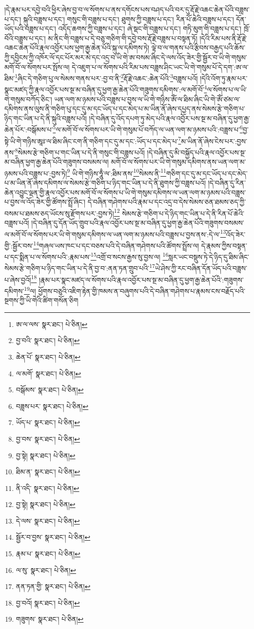 །དེ་རྣམ་པར་དབྱེ་བའི་ཕྱིར་ཞེས་བྱ་བ་ལ་སོགས་པ་ནས་དགོངས་པས་བཤད་པའི་བར་དུ་རྡོ་རྗེ་འཆང་ཆེན་པོའི་བཟླས་པ་དང་། སྐུའི་བཟླས་པ་དང་། གསུང་གི་བཟླས་པ་དང་། ཐུགས་ཀྱི་བཟླས་པ་དང་། རིན་པོ་ཆེའི་བཟླས་པ་དང་། དོན་ཡོད་པའི་བཟླས་པ་དང་། འདོད་ཆགས་ཀྱི་བཟླས་པ་དང་། ཞེ་སྡང་གི་བཟླས་པ་དང་། གཏི་མུག་གི་བཟླས་པ་དང་། ཁྲོ་བོའི་བཟླས་པ་དང་། མ་ནིང་གི་བཟླས་པ་དེ་བཅུ་གཅིག་གི་དབྱེ་བས་རྡོ་རྗེ་བཟླས་པ་བསྟན་ཏོ། །དེའི་རིམ་པས་ནི་རྡོ་རྗེ་འཆང་ཆེན་པོའི་རྣལ་འབྱོར་པས་ཕྱག་རྒྱ་ཆེན་པོའི་སྐུ་ལ་དམིགས་ཏེ། ལྟེ་བ་ལ་གནས་པའི་རྩིབས་བརྒྱད་པའི་ཆོས་ཀྱི་དབྱིངས་ཀྱི་འཁོར་ལོ་དང་པོར་མར་མེ་དང་འདྲ་བ་ཡི་གེ་ཨ་བསམ་ཞིང་དེ་ལས་འོད་ཟེར་གྱི་སྦྱོར་བ་ཡི་གེ་གསུམ་མགོ་བོ་ལ་སོགས་པར་སྤོས་ལ། དེ་འཇུག་པ་ལ་སོགས་པའི་རིམ་པས་བཟླས་ཤིང་ཡང་ཡི་གེ་གསུམ་པོ་དེ་དག་:ཨ་ལ་ཐིམ་\footnote{ཨ་ལ་ལས་  སྣར་ཐང་།  པེ་ཅིན། }ཞིང་དེ་གཅིག་པུ་ལ་སེམས་གནས་པར་:བྱ་བ་ནི་\footnote{བྱ་བའི་  སྣར་ཐང་།  པེ་ཅིན། }རྡོ་རྗེ་འཆང་:ཆེན་པོའི་\footnote{ཆེན་པོ་  སྣར་ཐང་།  པེ་ཅིན། }བཟླས་པའོ། །དེའི་འོག་ཏུ་རྣམ་པར་སྣང་མཛད་ཀྱི་རྣལ་འབྱོར་པས་སྔ་མ་བཞིན་དུ་ཕྱག་རྒྱ་ཆེན་པོའི་གཟུགས་དམིགས་:ལ་མགོ་བོ་\footnote{ལ་མགོ་  སྣར་ཐང་།  པེ་ཅིན། }ལ་སོགས་པ་ལ་ཡི་གེ་གསུམ་བཀོད་ཅིང་། ཡན་ལག་མ་ཉམས་པའི་བཟླས་པ་བྱས་ལ་ཡི་གེ་གཉིས་ཨོཾ་ལ་ཐིམ་ཞིང་ཡི་གེ་ཨོཾ་ཙམ་ལ་དམིགས་ནས་ལུས་ནི་གཅིག་པུ་དང་དུ་མ་དང་ཡོད་པ་དང་མེད་པ་མ་ཡིན་ནོ་ཞེས་དཔྱད་ནས་སེམས་རྩེ་གཅིག་པ་ཉིད་གང་ཡིན་པ་དེ་ནི་སྐུའི་བཟླས་པའོ། །དེ་བཞིན་དུ་འོད་དཔག་ཏུ་མེད་པའི་རྣལ་འབྱོར་པས་སྔ་མ་བཞིན་དུ་ཕྱག་རྒྱ་ཆེན་པོར་:བསྒོམས་པ་\footnote{བསྒོམས་  སྣར་ཐང་།  པེ་ཅིན། }ལ་མགོ་བོ་ལ་སོགས་པར་ཡི་གེ་གསུམ་པོ་བཀོད་ལ་ཡན་ལག་མ་ཉམས་པའི་:བཟླས་པ་\footnote{བཟླས་པར་  སྣར་ཐང་།  པེ་ཅིན། }བྱ་སྟེ་ཡི་གེ་གཉིས་ཨཱཿ་ལ་ཐིམ་ཞིང་ངག་ནི་གཅིག་དང་དུ་མ་དང་:ཡོད་པ་དང་མེད་པ་\footnote{ཡོད་པ་  སྣར་ཐང་།  པེ་ཅིན། }མ་ཡིན་ནོ་ཞེས་ངེས་པར་:བྱས་ནས་\footnote{བྱ་བས་  སྣར་ཐང་།  པེ་ཅིན། }སེམས་རྩེ་གཅིག་པ་གང་ཡིན་པ་དེ་ནི་གསུང་གི་བཟླས་པའོ། །དེ་བཞིན་དུ་མི་བསྐྱོད་པའི་རྣལ་འབྱོར་པས་སྔ་མ་བཞིན་ཕྱག་རྒྱ་ཆེན་པོའི་གཟུགས་བསམས་ལ། མགོ་བོ་ལ་སོགས་པར་ཡི་གེ་གསུམ་དམིགས་ནས་ཡན་ལག་མ་ཉམས་པའི་བཟླས་པ་:བྱས་ཏེ།\footnote{བྱ་སྟེ།  སྣར་ཐང་།  པེ་ཅིན། } ཡི་གེ་གཉིས་ཧཱུྃ་ལ་:ཐིམ་ནས་\footnote{ཐིམ་ན་  སྣར་ཐང་།  པེ་ཅིན། }སེམས་ནི་\footnote{ནི་འདི་  སྣར་ཐང་།  པེ་ཅིན། }གཅིག་དང་དུ་མ་དང་ཡོད་པ་དང་མེད་པ་མ་ཡིན་ནོ་ཞེས་དམིགས་ལ་སེམས་རྩེ་གཅིག་པ་ཉིད་གང་ཡིན་པ་དེ་ནི་ཐུགས་ཀྱི་བཟླས་པའོ། །དེ་བཞིན་དུ་རིན་ཆེན་འབྱུང་ལྡན་གྱི་རྣལ་འབྱོར་པས་མགོ་བོ་ལ་སོགས་པ་ཡི་གེ་གསུམ་དམིགས་ལ་ཡན་ལག་མ་ཉམས་པའི་བཟླས་པ་བྱས་ལ་འོད་ཟེར་གྱི་ཚོགས་སྤྲོ་ཞིང་། དེ་བཞིན་གཤེགས་པའི་རྣམ་པ་དང་འདྲ་བ་དེས་སེམས་ཅན་ཐམས་ཅད་ཀྱི་བསམ་པ་ཐམས་ཅད་ཡོངས་སུ་རྫོགས་པར་:བྱས་ཏེ།\footnote{བྱ་སྟེ།  སྣར་ཐང་།  པེ་ཅིན། } སེམས་རྩེ་གཅིག་པ་དེ་ཉིད་གང་ཡིན་པ་དེ་ནི་རིན་པོ་ཆེའི་བཟླས་པའོ། །དེ་བཞིན་དུ་དོན་ཡོད་གྲུབ་པའི་རྣལ་འབྱོར་པས་སྔ་མ་བཞིན་དུ་ཕྱག་རྒྱ་ཆེན་པོའི་གཟུགས་བསམས་ལ་མགོ་བོ་ལ་སོགས་པར་ཡི་གེ་གསུམ་དམིགས་ལ་ཡན་ལག་མ་ཉམས་པའི་བཟླས་པ་བྱས་ནས་:དེ་ལ་\footnote{དེ་ལས་  སྣར་ཐང་།  པེ་ཅིན། }འོད་ཟེར་གྱི་:སྦྱོར་བས་\footnote{སྦྱོར་བ་བྱས་  སྣར་ཐང་།  པེ་ཅིན། }གཞལ་ཡས་ཁང་པ་དང་བཅས་པའི་དེ་བཞིན་གཤེགས་པའི་ཚོགས་སྤྲོས་ལ། དེ་རྣམས་ཀྱིས་བསྟན་པ་དང་སྨིན་པ་ལ་སོགས་པའི་:རྣམ་པས་\footnote{རྣམ་པ་  སྣར་ཐང་།  པེ་ཅིན། }འགྲོ་བ་སངས་རྒྱས་སུ་བྱས་ལ། \footnote{ལ་སུ་  སྣར་ཐང་།  པེ་ཅིན། }སླར་ཡང་བསྡུས་ཏེ་དེ་ཉིད་དུ་ཐིམ་ཞིང་སེམས་རྩེ་གཅིག་པ་ཉིད་གང་ཡིན་པ་དེ་ནི་བྱ་བ་:ནན་ཏན་གྲུབ་པའི་\footnote{ནན་ཏན་གྱི་  སྣར་ཐང་།  པེ་ཅིན། }ཡེ་ཤེས་ཀྱི་རང་བཞིན་དོན་ཡོད་པའི་བཟླས་པ་ཞེས་བྱའོ།\footnote{བྱ་བའོ།  སྣར་ཐང་།  པེ་ཅིན། } །རྣམ་པར་སྣང་མཛད་ལ་སོགས་པའི་རྣལ་འབྱོར་པས་སྔ་མ་བཞིན་དུ་ཕྱག་རྒྱ་ཆེན་པོའི་:གཟུགས་དམིགས་\footnote{གཟུགས་  སྣར་ཐང་།  པེ་ཅིན། }ལ། ཕྱོགས་བཅུའི་འཇིག་རྟེན་གྱི་ཁམས་ན་བཞུགས་པའི་དེ་བཞིན་གཤེགས་པ་རྣམས་ངས་བརྗོད་པའི་སྔགས་ཀྱི་ཡི་གེའི་ཚིག་གསོན་ཅིག 